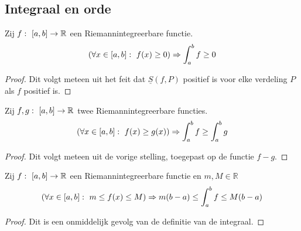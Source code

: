 \documentclass[main.tex]{subfiles}
\begin{document}
\subsection{Integraal en orde}
\label{sec:integraal-en-orde}

\begin{bpr}
  \label{pr:integraal-behoudt-orde-1}
  Zij $f:\ \interval{a}{b} \rightarrow \mathbb{R}$ een Riemannintegreerbare functie.
  \[ \left( \forall x\in \interval{a}{b}:\ f(x) \ge 0 \right) \Rightarrow \int_{a}^{b} f \ge 0 \]

  \begin{proof}
    Dit volgt meteen uit het feit dat $\underline{S}(f,P)$ positief is voor elke verdeling $P$ als $f$ positief is.
  \end{proof}
\end{bpr}

\begin{bpr}
  \label{pr:integraal-behoudt-orde-2}
  Zij $f,g:\ \interval{a}{b} \rightarrow \mathbb{R}$ twee Riemannintegreerbare functies.
  \[ \left( \forall x\in \interval{a}{b}:\ f(x) \ge g(x) \right) \Rightarrow \int_{a}^{b} f \ge \int_{a}^{b}g \]

  \begin{proof}
    Dit volgt meteen uit de vorige stelling, toegepast op de functie $f-g$.
  \end{proof}
\end{bpr}

\begin{bpr}
  Zij $f:\ \interval{a}{b} \rightarrow \mathbb{R}$ een Riemannintegreerbare functie en $m,M \in \mathbb{R}$
  \[ \left( \forall x\in \interval{a}{b}:\ m \le f(x) \le M \right) \Rightarrow m(b-a) \le \int_{a}^{b}f \le M(b-a) \]

  \begin{proof}
    Dit is een onmiddelijk gevolg van de definitie van de integraal.
  \end{proof}
\end{bpr}
\end{document}
